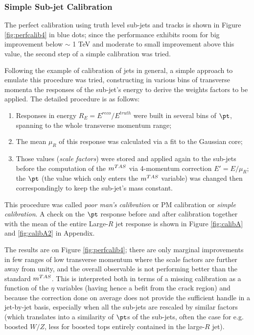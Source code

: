 \subsubsection{Simple Sub-jet Calibration}
The perfect calibration using truth level sub-jets and tracks is shown in Figure \ref{fig:perfcalib4} in blue dots; since the performance exhibits room for big improvement below $\sim$ 1 TeV and moderate to small improvement above this value, the second step of a simple calibration was tried.

Following the example of calibration of jets in general, a simple approach to emulate this procedure was tried, constructing in various bins of transverse momenta the responses of the sub-jet's energy to derive the weights factors to be applied. The detailed procedure is as follows:
\begin{enumerate}
 \item Responses in energy $R_E=E^{reco}/E^{truth}$ were built in several bins of $\pt$, spanning to the whole transverse momentum range;
 \item The mean $\mu_R$ of this response was calculated via a fit to the Gaussian core;
 \item Those values (\textit{scale factors}) were stored and applied again to the sub-jets before the computation of the $m^{TAS}$ via 4-momentum correction $E'=E/\mu_R$; the $\pt$ (the value which only enters the $m^{TAS}$ variable) was changed then correspondingly to keep the sub-jet's mass constant.
\end{enumerate}

This procedure was called \textit{poor man's calibration} or PM calibration or \textit{simple calibration}.
A check on the $\pt$ response before and after calibration together with the mean of the entire Large-$R$ jet response is shown in Figure \ref{fig:calibA} and \ref{fig:calibA2} in Appendix.

The results are on Figure \ref{fig:perfcalib4}; there are only marginal improvements in few ranges of low transverse momentum where the scale factors are further away from unity, and the overall observable is not performing better than the standard $m^{TAS}$. This is interpreted both in terms of a missing calibration as a function of the $\eta$ variables (having hence a befit from the crack region) and because the correction done on average does not provide the sufficient handle in a jet-by-jet basis, especially when all the sub-jets are rescaled by similar factors (which translates into a similarity of $\pt$s of the sub-jets, often the case for e.g. boosted $W/Z$, less for boosted tops entirely contained in the large-$R$ jet).

